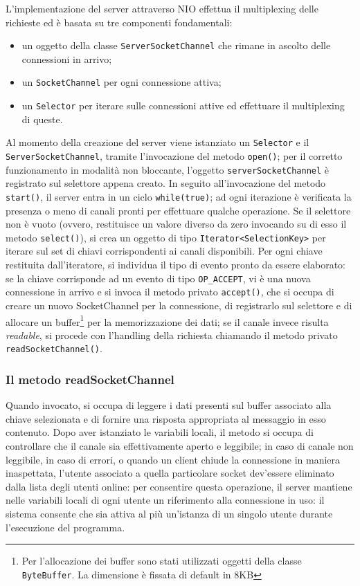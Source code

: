 \documentclass{article}
\begin{document}
L'implementazione del server attraverso NIO effettua il multiplexing delle richieste ed è basata su tre componenti fondamentali: 
\begin{itemize}
    \item un oggetto della classe \texttt{ServerSocketChannel} che rimane in ascolto delle connessioni in arrivo;
    \item un \texttt{SocketChannel} per ogni connessione attiva;
    \item un \texttt{Selector} per iterare sulle connessioni attive ed effettuare il multiplexing di queste.
\end{itemize}
Al momento della creazione del server viene istanziato un \texttt{Selector} e il \texttt{ServerSocketChannel}, tramite l'invocazione del metodo \texttt{open()}; per il corretto funzionamento in modalità non bloccante, l'oggetto \texttt{serverSocketChannel} è registrato sul selettore appena creato. In seguito all'invocazione del metodo \texttt{start()}, il server entra in un ciclo \texttt{while(true)}; ad ogni iterazione è verificata la presenza o meno di canali pronti per effettuare qualche operazione. Se il selettore non è vuoto (ovvero, restituisce un valore diverso da zero invocando su di esso il metodo \texttt{select()}), si crea un oggetto di tipo \texttt{Iterator<SelectionKey>} per iterare sul set di chiavi corrispondenti ai canali disponibili. Per ogni chiave restituita dall'iteratore, si individua il tipo di evento pronto da essere elaborato: se la chiave corrisponde ad un evento di tipo \texttt{OP\_ACCEPT}, vi è una nuova connessione in arrivo e si invoca il metodo privato \texttt{accept()}, che si occupa di creare un nuovo SocketChannel per la connessione, di registrarlo sul selettore e di allocare un buffer\footnote{Per l'allocazione dei buffer sono stati utilizzati oggetti della classe \texttt{ByteBuffer}. La dimensione è fissata di default in 8KB} per la memorizzazione dei dati; se il canale invece risulta \emph{readable}, si procede con l'handling della richiesta chiamando il metodo privato \texttt{readSocketChannel()}.

\subsubsection{Il metodo readSocketChannel}
Quando invocato, si occupa di leggere i dati presenti sul buffer associato alla chiave selezionata e di fornire una risposta appropriata al messaggio in esso contenuto. Dopo aver istanziato le variabili locali, il metodo si occupa di controllare che il canale sia effettivamente aperto e leggibile; in caso di canale non leggibile, in caso di errori, o quando un client chiude la connessione in maniera inaspettata, l'utente associato a quella particolare socket dev'essere eliminato dalla lista degli utenti online: per consentire questa operazione, il server mantiene nelle variabili locali di ogni utente un riferimento alla connessione in uso: il sistema consente che sia attiva al più un'istanza di un singolo utente durante l'esecuzione del programma.
\end{document}
